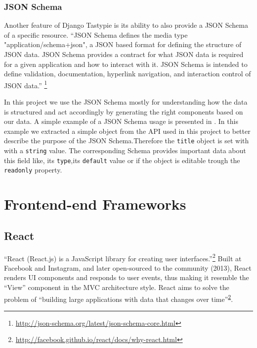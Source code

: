 \subsubsection{JSON Schema}
\label{sub-sub-sec:json-schema}

Another feature of Django Tastypie is its ability to also provide a JSON Schema of a specific resource. ``JSON Schema defines the media type "application/schema+json", a JSON based format for defining the structure of JSON data. JSON Schema provides a contract for what JSON data is required for a given application and how to interact with it. JSON Schema is intended to define validation, documentation, hyperlink navigation, and interaction control of JSON data.'' \footnote{\url{http://json-schema.org/latest/json-schema-core.html}}

In this project we use the JSON Schema mostly for understanding how the data is structured and act accordingly by generating the right components based on our data. A simple example of a JSON Schema usage is presented in . In this example we extracted a simple object from the API used in this project to better describe the purpose of the JSON Schema.Therefore the \texttt{title} object is set with with a \texttt{string} value. The corresponding Schema provides important data about this field like, its \texttt{type},its \texttt{default} value or if the object is editable trough the \texttt{readonly} property.
\\


\section{Frontend-end Frameworks}
\label{sec:frontend}

\subsection{React}
\label{sub-sec:react}

``React (React.js) is a JavaScript library for creating user interfaces.''\footnote{\label{why-react}\url{http://facebook.github.io/react/docs/why-react.html}} Built at Facebook and Instagram, and later open-sourced to the community (2013), React renders UI components and responds to user events, thus making it resemble the ``View'' component in the MVC architecture style. React aims to solve the problem of ``building large applications with data that changes over time''\textsuperscript{\ref{why-react}}.

